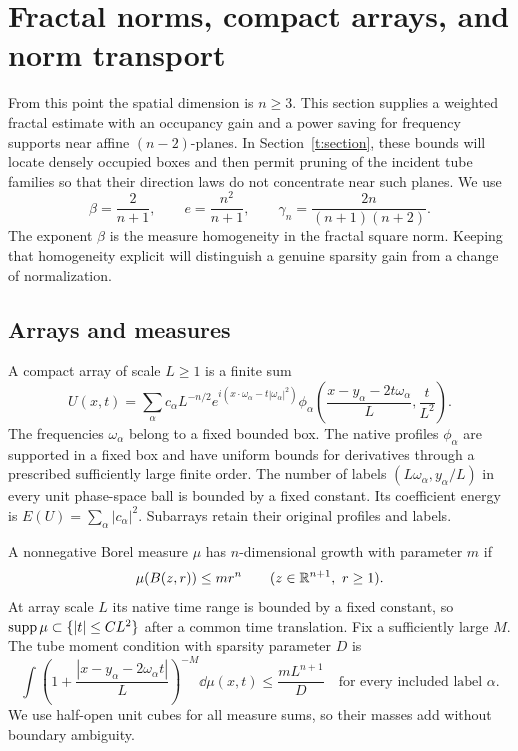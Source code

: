 \section{Fractal norms, compact arrays, and norm transport}
\label{d:section}

From this point the spatial dimension is $n\ge3$.  This section supplies
a weighted fractal estimate with an occupancy gain and a power saving
for frequency supports near affine $(n-2)$-planes.  In
Section~\ref{t:section}, these bounds will locate densely occupied
boxes and then permit pruning of the incident tube families so that
their direction laws do not concentrate near such planes.  We use
\begin{equation}
 \beta=\frac2{n+1},\qquad e=\frac{n^2}{n+1},
 \qquad \gamma_n=\frac{2n}{(n+1)(n+2)}.
 \label{d:exponents}
\end{equation}
The exponent $\beta$ is the measure homogeneity in the fractal square
norm.  Keeping that homogeneity explicit will distinguish a genuine
sparsity gain from a change of normalization.

\subsection{Arrays and measures}

\begin{definition}
\label{d:measure}
A compact array of scale $L\ge1$ is a finite sum
\begin{equation}
 U(x,t)=\sum_\alpha c_\alpha L^{-n/2}
 e^{i(x\cdot\omega_\alpha-t|\omega_\alpha|^2)}
 \phi_\alpha\!\left(
     \frac{x-y_\alpha-2t\omega_\alpha}{L},\frac t{L^2}\right).
 \label{d:array}
\end{equation}
The frequencies $\omega_\alpha$ belong to a fixed bounded box.
The native profiles $\phi_\alpha$ are supported in a fixed box and have
uniform bounds for derivatives through a prescribed sufficiently large
finite order.  The number of labels
$(L\omega_\alpha,y_\alpha/L)$ in every unit phase-space ball is
bounded by a fixed constant.  Its coefficient energy is
$E(U)=\sum_\alpha|c_\alpha|^2$.
Subarrays retain their original profiles and labels.

A nonnegative Borel measure $\mu$ has $n$-dimensional growth with
parameter $m$ if
\begin{equation}
 \mu(B(z,r))\le m r^n\qquad(z\in\mathbb R^{n+1},\ r\ge1).
 \label{d:ball-growth}
\end{equation}
At array scale $L$ its native time range is bounded by a fixed
constant, so $\operatorname{supp}\mu\subset\{|t|\le C L^2\}$ after a common time
translation.  Fix a sufficiently large $M$.  The tube moment condition
with sparsity parameter $D$ is
\begin{equation}
 \int\left(1+
       \frac{|x-y_\alpha-2\omega_\alpha t|}{L}\right)^{-M}
          \dd\mu(x,t)
       \le \frac{mL^{n+1}}D
       \quad\text{for every included label }\alpha.
 \label{d:tube-moment}
\end{equation}
We use half-open unit cubes for all measure sums, so their masses add
without boundary ambiguity.
\end{definition}


